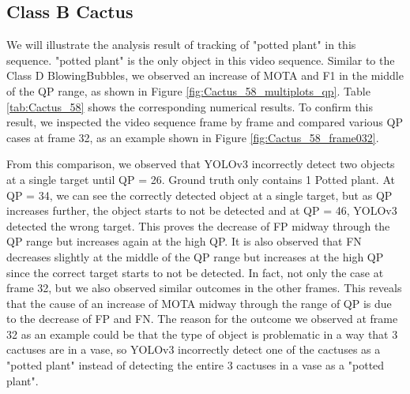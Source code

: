 \subsection{Class B Cactus}
We will illustrate the analysis result of tracking of "potted plant" in this sequence. "potted plant" is the only object in this video sequence. Similar to the Class D BlowingBubbles, we observed an increase of MOTA and F1 in the middle of the QP range, as shown in Figure \ref{fig:Cactus_58_multiplots_qp}. Table \ref{tab:Cactus_58} shows the corresponding numerical results. To confirm this result, we inspected the video sequence frame by frame and compared various QP cases at frame 32, as an example shown in Figure \ref{fig:Cactus_58_frame032}.



From this comparison, we observed that YOLOv3 incorrectly detect two objects at a single target until QP = 26. Ground truth only contains 1 Potted plant. At QP = 34, we can see the correctly detected object at a single target, but as QP increases further, the object starts to not be detected and at QP = 46, YOLOv3 detected the wrong target. This proves the decrease of FP midway through the QP range but increases again at the high QP. It is also observed that FN decreases slightly at the middle of the QP range but increases at the high QP since the correct target starts to not be detected. In fact, not only the case at frame 32, but we also observed similar outcomes in the other frames. This reveals that the cause of an increase of MOTA midway through the range of QP is due to the decrease of FP and FN. The reason for the outcome we observed at frame 32 as an example could be that the type of object is problematic in a way that 3 cactuses are in a vase, so YOLOv3 incorrectly detect one of the cactuses as a "potted plant" instead of detecting the entire 3 cactuses in a vase as a "potted plant".


